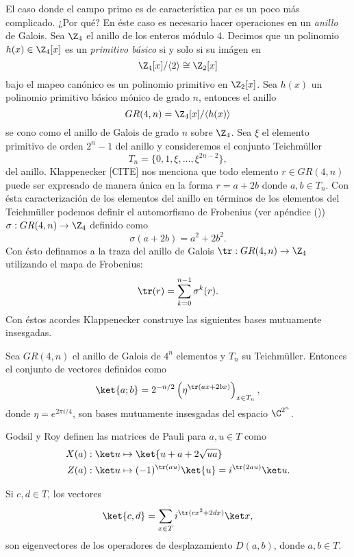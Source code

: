   El caso donde el campo primo es de característica par es
  un poco más complicado. ¿Por qué? En éste caso es
  necesario hacer operaciones en un \textit{anillo} de
  Galois. Sea $\Z_4$ el anillo de los enteros módulo 4.
  Decimos que un polinomio $h(x) \in \Z_4[x]$ es un
  \textit{primitivo básico} si y solo si su imágen en
  \[
    \Z_4[x] / \langle 2 \rangle
    \cong
    \Z_2[x]
  \] 
  bajo el mapeo canónico es un polinomio primitivo en
  $\Z_2[x]$. Sea $h(x)$ un polinomio primitivo básico mónico
  de grado $n$, entonces el anillo
  \begin{equation}
    GR(4,n)
    = \Z_4[x] / \langle h(x) \rangle    
  \end{equation}
  se cono como el anillo de Galois de grado $n$ sobre
  $\Z_4$.
  Sea $\xi$ el elemento primitivo de orden $2^{n}-1$ del
  anillo y consideremos el conjunto Teichmüller
  \[
    T_n
    = \{0,1,\xi,\ldots,\xi^{2n-2}\},
  \] 
  del anillo. Klappenecker [CITE] nos menciona que todo
  elemento $r \in GR(4,n)$ puede ser expresado de manera
  única en la forma $r = a + 2b$ donde $a,b \in T_n$. Con
  ésta caracterización de los elementos del anillo en
  términos de los elementos del Teichmüller podemos definir
  el automorfismo de Frobenius (ver apéndice ()) $\sigma :
  GR(4,n) \to \Z_4$ definido como
  \[
    \sigma(a+2b)
    = a^2+2b^2.
  \] 
  Con ésto definamos a la traza del anillo de Galois $\tr :
  GR(4,n) \to \Z_4$ utilizando el mapa de Frobenius:
  \[
    \tr(r)
    = \sum_{k=0}^{n-1} \sigma^{k}(r).
  \] 
  Con éstos acordes Klappenecker construye las siguientes
  bases mutuamente insesgadas.
  \begin{proposition}
    Sea $GR(4,n)$ el anillo de Galois de $4^{n}$ elementos y
    $T_n$ su Teichmüller. Entonces el conjunto de vectores
    definidos como
    \begin{equation}
      \ket{a; b}
      = 2^{-n / 2} \left(
        \eta^{\tr\left( ax + 2bx \right)}
      \right)_{x \in T_n},
    \end{equation}
    donde $\eta = e^{2\pi i / 4}$, son bases mutuamente
    insesgadas del espacio $\C^{2^{n}}$.
  \end{proposition}

  Godsil y Roy definen las matrices de Pauli para $a, u \in
  T$ como
  \begin{align}
    X(a) &: \ket u \mapsto \ket{u+a+2 \sqrt{ua}} \\
    Z(a) &: \ket u \mapsto (-1)^{\tr(au)} \ket{u}
    = i^{\tr(2au)}\ket u.
  \end{align}
  \begin{proposition}
    Si $c,d \in T$, los vectores
    \begin{equation}
      \ket{c,d}
      = \sum_{x \in T}^{} i^{\tr(cx^2+2dx)} \ket x,
    \end{equation}
    son eigenvectores de los operadores de desplazamiento
    $D(a,b)$, donde $a,b \in T$.
  \end{proposition}

